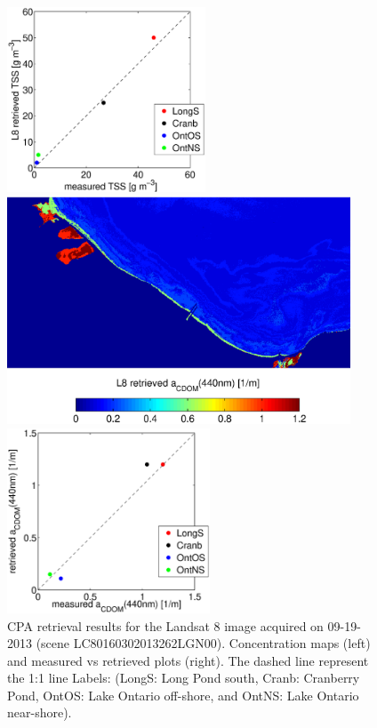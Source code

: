 \documentclass[onecolumn,3p,letterpaper]{elsarticle}
\begin{document}
\begin{figure}[htbp!]
  \hfill
  \begin{minipage}[d]{0.35\linewidth}
      \includegraphics[trim=40 0 0 0,clip,height=5.5cm]{./Images/TSSretvsmea130919_150420}
  \end{minipage}

  \begin{minipage}[c]{0.55\linewidth}
  		\centering
      \includegraphics[trim=0 0 0 30,clip,height=6.8cm]{./Images/CDOMmap130919_150420}  
  \end{minipage}
  \hfill
  \begin{minipage}[d]{0.35\linewidth}
      \includegraphics[trim=40 0 0 0,clip,height=5.5cm]{./Images/CDOMretvsmea130919_150420}
  \end{minipage}
% 
  \caption{CPA retrieval results for the Landsat 8 image acquired on 09-19-2013 (scene LC80160302013262LGN00). Concentration maps (left) and measured vs retrieved plots (right). The dashed line represent the 1:1 line Labels: (LongS: Long Pond south, Cranb: Cranberry Pond, OntOS: Lake Ontario off-shore, and OntNS: Lake Ontario near-shore). \label{fig:CPAsMaps130919} } 
\end{figure}
\end{document}
